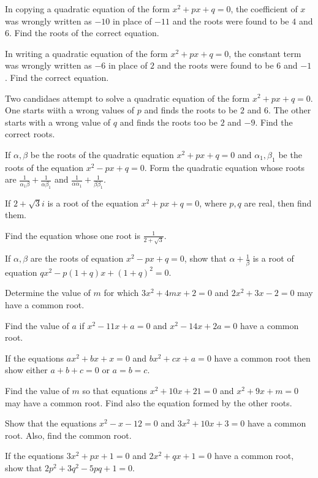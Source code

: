 \item In copying a quadratic equation of the form $x^2 + px + q = 0$, the coefficient of $x$ was wrongly written as $-10$ in place
  of $-11$ and the roots were found to be $4$ and $6$. Find the roots of the correct equation.
\item In writing a quadratic equation of the form $x^2 + px + q = 0$, the constant term was wrongly written as $-6$ in place of $2$
  and the roots were found to be $6$ and $-1$. Find the correct equation.
\item Two candidaes attempt to solve a quadratic equation of the form $x^2 + px + q = 0$. One starts wiith a wrong values of $p$
  and finds the roots to be $2$ and $6$. The other starts with a wrong value of $q$ and finds the roots too be $2$ and $-9$. Find
  the correct roots.
\item If $\alpha, \beta$ be the roots of the quadratic equation $x^2 + px + q = 0$ and $\alpha_1, \beta_1$ be the roots of the
  equation $x^2 - px + q = 0$. Form the quadratic equation whose roots are $\frac{1}{\alpha_1\beta} + \frac{1}{\alpha\beta_1}$ and
  $\frac{1}{\alpha\alpha_1} + \frac{1}{\beta\beta_1}$.
\item If $2 + \sqrt{3}i$ is a root of the equation $x^2 + px + q = 0$, where $p, q$ are real, then find them.
\item Find the equation whose one root is $\frac{1}{2 + \sqrt{3}}$.
\item If $\alpha, \beta$ are the roots of equation $x^2 - px + q = 0$, show that $\alpha + \frac{1}{\beta}$ is a root of equation
  $qx^2 - p(1 + q)x + (1 + q)^2 = 0$.
\item Determine the value of $m$ for which $3x^2 + 4mx + 2 = 0$ and $2x^2 + 3x - 2 = 0$ may have a common root.
\item Find the value of $a$ if $x^2 - 11x + a = 0$ and $x^2 - 14x + 2a = 0$ have a common root.
\item If the equations $ax^2 + bx + x = 0$ and $bx^2 + cx + a = 0$ have a common root then show either $a + b + c = 0$ or $a = b =
  c$.
\item Find the value of $m$ so that equations $x^2 + 10x + 21 = 0$ and $x^2 + 9x + m = 0$ may have a common root. Find also the
  equation formed by the other roots.
\item Show that the equations $x^2 - x - 12 = 0$ and $3x^2 + 10x + 3 = 0$ have a common root. Also, find the common root.
\item If the equations $3x^2 + px + 1 = 0$ and $2x^2 + qx + 1 = 0$ have a common root, show that $2p^2 + 3q^2 - 5pq + 1 = 0$.
